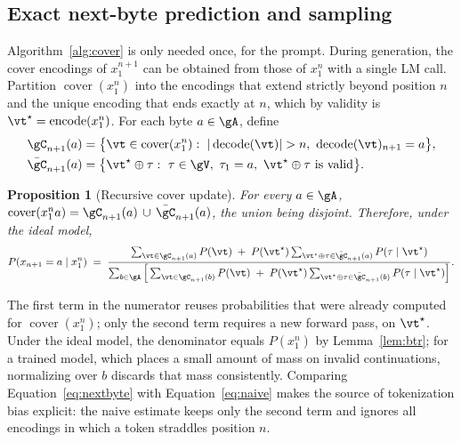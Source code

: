 \documentclass{article} %
\newtheorem{proposition}{Proposition}
\newcommand{\enc}{\operatorname{encode}}
\newcommand{\dec}{\operatorname{decode}}
\newcommand{\cover}{\operatorname{cover}}
\begin{document}
\subsection{Exact next-byte prediction and sampling}
\label{sec:sampling}
Algorithm~\ref{alg:cover} is only needed once, for the prompt. During generation, the cover encodings of $x_1^{n+1}$ can be obtained from those of $x_1^n$ with a single LM call. Partition $\cover(x_1^n)$ into the encodings that extend strictly beyond position $n$ and the unique encoding that ends exactly at $n$, which by validity is $\vt^\star=\enc(x_1^n)$. For each byte $a\in\gA$, define
\begin{align}
\gC_{n+1}(a) &= \big\{\vt\in\cover(x_1^n):\ |\dec(\vt)|>n,\ \dec(\vt)_{n+1}=a\big\}, \label{eq:regroup}\\
\bar\gC_{n+1}(a) &= \big\{\vt^\star\oplus\tau:\ \tau\in\gV,\ \tau_1=a,\ \vt^\star\oplus\tau\text{ is valid}\big\}. \label{eq:extend}
\end{align}

\begin{proposition}[Recursive cover update]
\label{prop:recursion}
For every $a\in\gA$, $\cover(x_1^n a)=\gC_{n+1}(a)\,\cup\,\bar\gC_{n+1}(a)$, the union being disjoint. Therefore, under the ideal model,
\begin{equation}
\label{eq:nextbyte}
P(x_{n+1}=a\mid x_1^n)\;=\;\frac{\sum_{\vt\in\gC_{n+1}(a)}P(\vt)\;+\;P(\vt^\star)\sum_{\vt^\star\oplus\tau\in\bar\gC_{n+1}(a)}P(\tau\mid\vt^\star)}{\sum_{b\in\gA}\Big[\sum_{\vt\in\gC_{n+1}(b)}P(\vt)\;+\;P(\vt^\star)\sum_{\vt^\star\oplus\tau\in\bar\gC_{n+1}(b)}P(\tau\mid\vt^\star)\Big]}.
\end{equation}
\end{proposition}

The first term in the numerator reuses probabilities that were already computed for $\cover(x_1^n)$; only the second term requires a new forward pass, on $\vt^\star$. Under the ideal model, the denominator equals $P(x_1^n)$ by Lemma~\ref{lem:btr}; for a trained model, which places a small amount of mass on invalid continuations, normalizing over $b$ discards that mass consistently. Comparing Equation~\ref{eq:nextbyte} with Equation~\ref{eq:naive} makes the source of tokenization bias explicit: the naive estimate keeps only the second term and ignores all encodings in which a token straddles position $n$.
\end{document}
